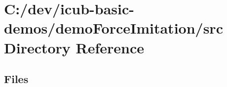 \section{C\+:/dev/icub-\/basic-\/demos/demo\+Force\+Imitation/src Directory Reference}
\label{dir_9ae835d45530d23e4ddf2ad0cc13b598}
\subsection*{Files}
\begin{DoxyCompactItemize}
\end{DoxyCompactItemize}

